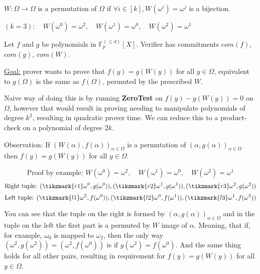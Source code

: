 \documentclass[../lecture-notes.tex]{subfiles}
\begin{document}
\begin{definition}
\(W : \Omega \rightarrow \Omega\) is a permutation of \(\Omega\) if \(\forall i \in [k], W(\omega^i) = \omega^{j}\) is a bijection.
\end{definition}

\begin{example}
 $(k=3): \quad W(\omega^0) = \omega^2, \quad W(\omega^1) = \omega^0, \quad W(\omega^2) = \omega^1$
\end{example}

Let \(f\) and \(g\) be polynomials in \(\mathbb{F}_p^{(\leq d)}[X]\). Verifier has commitments \(com(f)\), \(com(g)\), \(com(W)\).

\underline{Goal:} prover wants to prove that \(f(y) = g(W(y))\) for all \(y \in \Omega\), equivalent to \(g(\Omega)\) is the same as \(f(\Omega)\), permuted by the prescribed \(W\).

Naive way of doing this is by running \textbf{ZeroTest} on \(f(y) - g(W(y)) = 0\) on \(\Omega\), however that would result in proving needing to manipulate polynomials of degree \(k^2\), resulting in quadratic prover time. We can reduce this to a product-check on a polynomial of degree \(2k\).

\begin{remark}
Observation: If \((W(\alpha), f(\alpha))_{\alpha \in \Omega}\) is a permutation of \((\alpha, g(\alpha))_{\alpha \in \Omega}\) then \(f(y) = g(W(y))\) for all \(y \in \Omega \).
\end{remark}

\begin{example}
\[
\text{Proof by example: } W(\omega^0) = \omega^2, \quad W(\omega^1) = \omega^0, \quad W(\omega^2) = \omega^1 
\]
\[
\text{Right tuple: } (\tikzmark{r1}\omega^0, g(\omega^0)), (\tikzmark{r2}\omega^1, g(\omega^1)), (\tikzmark{r3}\omega^2, g(\omega^2))
\]
\[
\text{Left tuple: } (\tikzmark{l1}\omega^2, f(\omega^0)), (\tikzmark{l2}\omega^0, f(\omega^1)), (\tikzmark{l3}\omega^1, f(\omega^2))
\]

You can see that the tuple on the right is formed by \((\alpha, g(\alpha))_{\alpha \in \Omega}\) and in the tuple on the left the first part is a permuted by \(W\) image of \(\alpha\). Meaning, that if, for example, \(\omega_0\) is mapped to \(\omega_2\), then the only way \((\omega^2, g(\omega^2)) = (\omega^2, f(\omega^0))\) is if \(g(\omega^2) = f(\omega^0)\). And the same thing holds for all other pairs, resulting in requirement for \(f(y) = g(W(y))\) for all \(y \in \Omega \).
\end{example}
\end{document}
